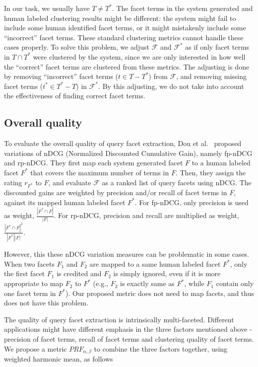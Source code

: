
In our task, we usually have $T\neq T^*$. The facet terms in the system generated and human labeled clustering results might be different: the system might fail to include some human identified facet terms, or it might mistakenly include some ``incorrect'' facet terms. These standard clustering metrics cannot handle these cases properly. To solve this problem, we adjust $\mathcal{F}$ and $\mathcal{F}^*$ as if only facet terms in $T \cap T^{*}$ were clustered by the system, since we are only interested in how well the ``correct'' facet terms are clustered from these metrics. The adjusting is done by removing ``incorrect'' facet terms ($t \in T-T^*$) from $\mathcal{F}$, and removing missing facet terms ($t^{*}\in T^*-T$) in $\mathcal{F}^{*}$.  By this adjusting, we do not take into account the effectiveness of finding correct facet terms.

\subsection{Overall quality}
\label{sec:evalmetricsall}
To evaluate the overall quality of query facet extraction, Dou et al.~\cite{dou2011finding} proposed variations of nDCG (Normalized Discounted Cumulative Gain), namely fp-nDCG and rp-nDCG. They first map each system generated facet $F$ to a human labeled facet $F^*$ that covers the maximum number of terms in $F$. Then, they assign the rating $r_{F^*}$ to $F$, and evaluate $\mathcal{F}$ as a ranked list of query facets using nDCG.
The discounted gains are weighted by precision and/or recall of facet terms in $F$, against its mapped human labeled facet $F^*$. For fp-nDCG, only precision is used as weight, $\frac{|F^* \cap F|}{|F|}$.
For rp-nDCG, precision and recall are multiplied as weight, $\frac{|F^* \cap F|^2}{|F^*||F|}$. 

However, this these nDCG variation measures can be problematic in some cases.
When two facets $F_1$ and $F_2$ are mapped to a same human labeled facet $F^*$, only the first facet $F_1$ is credited and $F_2$ is simply ignored, even if it is more appropriate to map $F_2$ to $F^*$ (e.g., $F_2$ is exactly same as $F^*$, while $F_1$ contain only one facet term in $F^*$). Our proposed metric does not need to map facets, and thus does not have this problem.

The quality of query facet extraction is intrinsically multi-faceted. Different applications might have different emphasis in the three factors mentioned above - precision of facet terms, recall of facet terms 
and clustering quality of facet terms. We propose a metric $PRF_{\alpha,\beta}$ to combine the three factors together, using weighted harmonic mean, as follows

